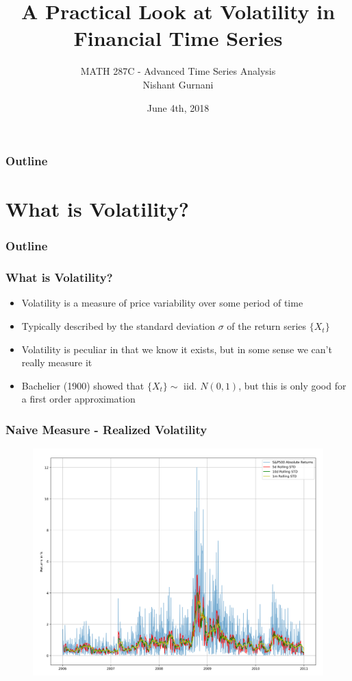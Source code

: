 \documentclass{beamer}
\title[]{A Practical Look at Volatility in Financial Time Series}
\author{MATH 287C - Advanced Time Series Analysis \\ Nishant Gurnani}
\date{June 4th, 2018}
\begin{document}
\begin{frame}
\titlepage
\end{frame}


\begin{frame}
\frametitle{Outline}
\tableofcontents[]
\end{frame}

\section{What is Volatility?}

\begin{frame}
\frametitle{Outline}
\tableofcontents[currentsection]
\end{frame}

\begin{frame}
\frametitle{What is Volatility?}
\begin{itemize}
\item{Volatility is a measure of price variability over some period of time}
\item{Typically described by the standard deviation $\sigma$ of the return series $\{X_t\}$}
\item{Volatility is peculiar in that we know it exists, but in some sense we can't really measure it}
\item{Bachelier (1900) showed that $\{X_t\} \sim$ iid. $N(0,1)$, but this is only good for a first order approximation}
\end{itemize}
\end{frame}

\begin{frame}
\frametitle{Naive Measure - Realized Volatility}
\begin{figure}[h!]
\includegraphics[width=\textwidth]{abs_sp500_returns.png}
\end{figure}
\end{frame}
\end{document}
